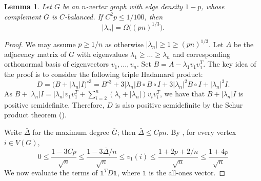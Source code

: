\documentclass[11pt]{article}
\theoremstyle{plain}
\newtheorem{lemma}[theorem]{Lemma}
\theoremstyle{definition}
\begin{document}
\begin{lemma}\label{lemma: degree bounds for balanced graphs}
   Let $G$ be an $n$-vertex graph with edge density $1-p$, whose complement $\overline{G}$ is $C$-balanced. If $C^2p \le 1/100$, then 
     $$|\lambda_n| = \Omega\big((pn)^{1/3}\big).$$
\end{lemma}
\begin{proof}
    We may assume $p \ge 1/n$ as otherwise $|\lambda_n| \ge 1 \ge (pn)^{1/3}$. Let $A$ be the adjacency matrix of $G$ with eigenvalues $\lambda_1\geq \dots\geq \lambda_n$ and corresponding orthonormal basis of eigenvectors $v_1,\dots,v_n$. 
    Set $B=A-\lambda_1v_1v_1^T$. 
    The key idea of the proof is to consider the following triple Hadamard product:
    $$D= \big(B+|\lambda_n|I \big)^{\circ 3}=B^{\circ 3}+3|\lambda_n|B\circ B\circ I+3|\lambda_n|^2B\circ I+|\lambda_n|^3 I.$$
    As $B+|\lambda_n|I=|\lambda_n|v_1v_1^T+\sum_{i=2}^n (\lambda_i+|\lambda_n|)v_iv_i^T$, we have that $B+|\lambda_n|I$ is positive semidefinite. 
    Therefore, $D$ is also positive semidefinite by the Schur product theorem (). 

    Write $\bar{\Delta}$ for the maximum degree $\overline{G}$; then $\bar{\Delta} \le Cpn$.
    By , for every vertex $i\in V(G)$, 
    \begin{equation} \label{eq: scale of v1}
        0\le \frac{1-3Cp}{\sqrt{n}} \le \frac{1-3\bar{\Delta}/n}{\sqrt{n}} \le v_1(i) \le \frac{1+2p+2/n}{\sqrt{n}} \le \frac{1+4p}{\sqrt{n}}
    \end{equation}
    We now evaluate the terms of $\mathds{1}^T D \mathds{1}$, where $\mathds{1}$ is the all-ones vector.
    

\end{proof}
\end{document}
